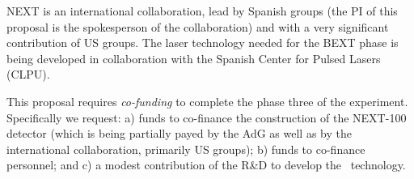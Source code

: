 NEXT is an international collaboration, lead by Spanish groups (the PI of this proposal is the spokesperson of the collaboration) and with a very significant contribution of US groups. The laser technology needed for the BEXT phase is being developed in collaboration with the Spanish Center for Pulsed Lasers (CLPU). 

 This proposal requires {\em co-funding} to complete the phase three of the experiment. Specifically we request: a) funds to co-finance the construction of the NEXT-100 detector (which is being partially payed by the AdG as well as by the international collaboration, primarily US groups); b) funds to co-finance personnel; and c) a modest contribution of the R\&D to develop the \BATA\ technology.   

